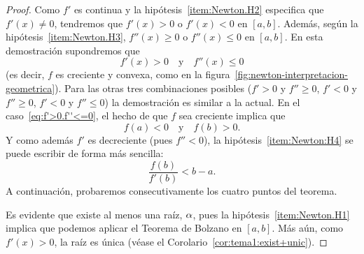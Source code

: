 \begin{proof}
  Como $f'$ es continua y la hipótesis~\ref{item:Newton.H2} especifica
  que $f'(x) \neq 0$, tendremos que $f'(x)>0$ o $f'(x)<0$ en $[a,b]$.
  Además, según la hipótesis~\ref{item:Newton.H3}, $f''(x)\ge 0$ o
  $f''(x)\le 0$ en $[a,b]$. En esta demostración supondremos que
  \begin{equation}
    f'(x)>0 \quad \text{y}\quad f''(x)\le 0
    \label{eq:f'>0.f''<=0}
  \end{equation}
  (es decir, $f$ es creciente y convexa, como en la
  figura~\ref{fig:newton-interpretacion-geometrica}). Para las otras
  tres combinaciones posibles ($f'>0$ y $f''\ge 0$, $f'<0$ y $f''\ge 0$,
  $f'<0$ y $f''\le 0$) la demostración es similar a la actual.  
  En el caso~\eqref{eq:f'>0.f''<=0}, el hecho de que $f$ sea creciente implica que
  \begin{equation*}
    f(a)<0 \quad\text{y}\quad f(b)>0.
  \end{equation*}
  Y como además $f'$ es decreciente (pues $f''<0$), la
  hipótesis~\ref{item:Newton:H4} se puede escribir de forma más
  sencilla:
  \begin{equation}
    \frac{f(b)}{f'(b)} < b-a.
    \label{eq:Newton:H4.simplificada}
  \end{equation}
  A continuación, probaremos consecutivamente los cuatro puntos del
  teorema.

  Es evidente que existe al menos una raíz, $\alpha$, pues la
  hipótesis~\ref{item:Newton.H1} implica que podemos aplicar el
  Teorema de Bolzano en $[a,b]$. Más aún, como $f'(x)>0$, la raíz es única (véase el
  Corolario~\ref{cor:tema1:exist+unic}).


\end{proof}

